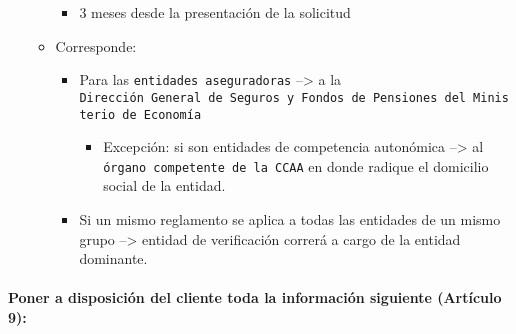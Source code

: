 \documentclass[
]{article}
\providecommand{\tightlist}{%
  \setlength{\itemsep}{0pt}\setlength{\parskip}{0pt}}
\begin{document}
\begin{itemize}
\begin{itemize}
    \begin{itemize}
    \tightlist
    \item
      3 meses desde la presentación de la solicitud
    \end{itemize}
  \item
    Corresponde:

    \begin{itemize}
    \tightlist
    \item
      Para las \texttt{entidades\ aseguradoras} --\textgreater{} a la
      \texttt{Dirección\ General\ de\ Seguros\ y\ Fondos\ de\ Pensiones\ del\ Ministerio\ de\ Economía}

      \begin{itemize}
      \tightlist
      \item
        Excepción: si son entidades de competencia autonómica
        --\textgreater{} al \texttt{órgano\ competente\ de\ la\ CCAA} en
        donde radique el domicilio social de la entidad.
      \end{itemize}
    \item
      Si un mismo reglamento se aplica a todas las entidades de un mismo
      grupo --\textgreater{} entidad de verificación correrá a cargo de
      la entidad dominante.
    \end{itemize}
  \end{itemize}
\end{itemize}

\hypertarget{poner-a-disposiciuxf3n-del-cliente-toda-la-informaciuxf3n-siguiente-artuxedculo-9}{%
\paragraph{\texorpdfstring{Poner a disposición del cliente toda la
información siguiente (\textbf{Artículo
9}):}{Poner a disposición del cliente toda la información siguiente (Artículo 9):}}\label{poner-a-disposiciuxf3n-del-cliente-toda-la-informaciuxf3n-siguiente-artuxedculo-9}}
\end{document}
